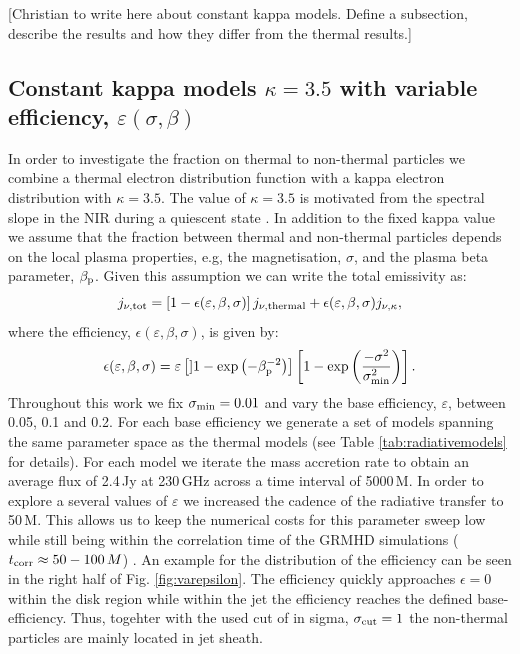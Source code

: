[Christian to write here about constant kappa models.  Define a subsection, describe the results and how they differ from the thermal results.]
\subsection{Constant kappa models $\kappa=3.5$ with variable efficiency, $\varepsilon(\sigma,\beta)$}

In order to investigate the fraction on thermal to non-thermal particles we combine a thermal electron distribution function with a kappa electron distribution with $\kappa=3.5$. The value of $\kappa=3.5$ is motivated from the spectral slope in the NIR during a quiescent state . In addition to the fixed kappa value we assume that the fraction between thermal and non-thermal particles depends on the local plasma properties, e.g, the magnetisation, $\sigma$, and the plasma beta parameter, $\beta_{\rm p}$. Given this assumption we can write the total emissivity as:
\begin{equation}
j_{\nu,\rm{tot}}=\left[1-\epsilon(\varepsilon,\beta, \sigma)\right] j_{\nu,\rm{thermal}} + \epsilon(\varepsilon,\beta, \sigma) j_{\nu, \kappa},
\label{eq:kappaeff}
\end{equation}
where the efficiency, $\epsilon(\varepsilon,\beta,\sigma)$, is given by:
\begin{equation}
    \epsilon(\varepsilon,\beta,\sigma)=\varepsilon\left[] 1 - \exp\left(-\beta_{\rm p}^{-2}\right)\right]\left[1-\exp\left(\frac{-\sigma^2}{\sigma_{\rm min}^2}\right)\right].
    \label{eq:efficiencybetasigma}
\end{equation}
Throughout this work we fix $\sigma_{\rm min}=0.01$ and vary the base efficiency, $\varepsilon$, between 0.05, 0.1 and 0.2. For each base efficiency we generate a set of models spanning the same parameter space as the thermal models (see Table \ref{tab:radiativemodels} for details). For each model we iterate the mass accretion rate to obtain an average flux of 2.4\,Jy at 230\,GHz across a time interval of 5000\,M. In order to explore a several values of $\varepsilon$ we increased the cadence of the radiative transfer to 50\,M. This allows us to keep the numerical costs for this parameter sweep low while still being within the correlation time of the GRMHD simulations ($t_{\rm corr}\approx 50-100\,M$) . An example for the distribution of the efficiency can be seen in the right half of  Fig. \ref{fig:varepsilon}. The efficiency quickly approaches $\epsilon=0$ within the disk region while within the jet the efficiency reaches the defined base-efficiency. Thus, togehter with the used cut of in sigma, $\sigma_{\rm cut}=1$ the non-thermal particles are mainly located in jet sheath.

